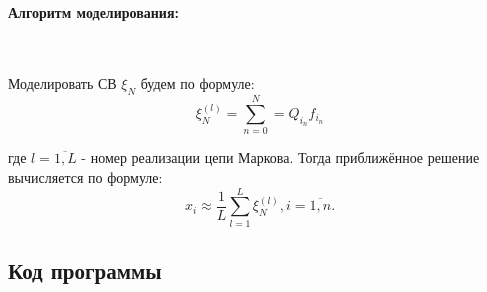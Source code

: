 \paragraph{Алгоритм моделирования:}\
\

Моделировать СВ $\xi_{N}$ будем по формуле:
\begin{equation}
\xi_{N}^{(l)}=\sum\limits_{n=0}^{N}=Q_{i_{n}}f_{i_{n}}
\end{equation}

где $l=\overline{1,L}$ - номер реализации цепи Маркова. Тогда приближённое решение вычисляется по формуле:
\begin{equation}
x_{i} \approx \frac{1}{L}\sum\limits_{l=1}^{L}\xi_{N}^{(l)}, i = \overline{1,n}.
\end{equation}

\subsection{Код программы}


